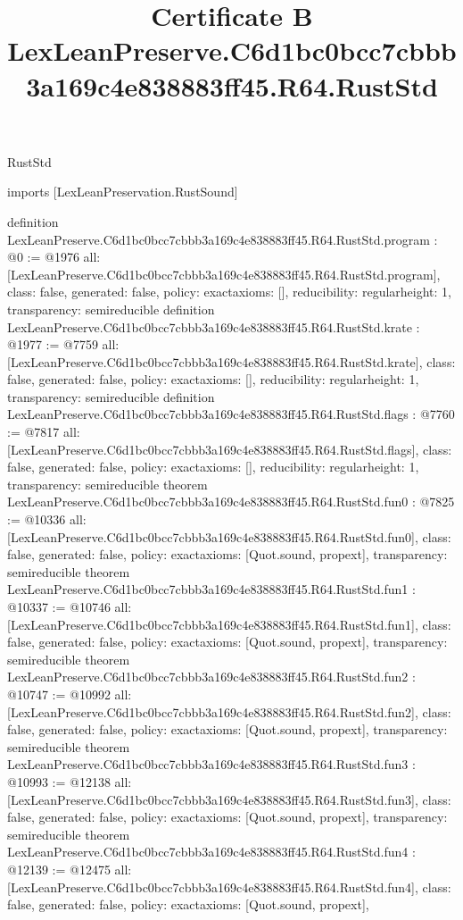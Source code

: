 \begin{lexlean}{RustStd}
\title{Certificate B LexLeanPreserve.C6d1bc0bcc7cbbb3a169c4e838883ff45.R64.RustStd}
\begin{coremodule}
imports [LexLeanPreservation.RustSound]

definition LexLeanPreserve.C6d1bc0bcc7cbbb3a169c4e838883ff45.R64.RustStd.program : @0 := @1976 {
  all: [LexLeanPreserve.C6d1bc0bcc7cbbb3a169c4e838883ff45.R64.RustStd.program],
  class: false,
  generated: false,
  policy: exact{axioms: []},
  reducibility: regular{height: 1},
  transparency: semireducible
}
definition LexLeanPreserve.C6d1bc0bcc7cbbb3a169c4e838883ff45.R64.RustStd.krate : @1977 := @7759 {
  all: [LexLeanPreserve.C6d1bc0bcc7cbbb3a169c4e838883ff45.R64.RustStd.krate],
  class: false,
  generated: false,
  policy: exact{axioms: []},
  reducibility: regular{height: 1},
  transparency: semireducible
}
definition LexLeanPreserve.C6d1bc0bcc7cbbb3a169c4e838883ff45.R64.RustStd.flags : @7760 := @7817 {
  all: [LexLeanPreserve.C6d1bc0bcc7cbbb3a169c4e838883ff45.R64.RustStd.flags],
  class: false,
  generated: false,
  policy: exact{axioms: []},
  reducibility: regular{height: 1},
  transparency: semireducible
}
theorem LexLeanPreserve.C6d1bc0bcc7cbbb3a169c4e838883ff45.R64.RustStd.fun0 : @7825 := @10336 {
  all: [LexLeanPreserve.C6d1bc0bcc7cbbb3a169c4e838883ff45.R64.RustStd.fun0],
  class: false,
  generated: false,
  policy: exact{axioms: [Quot.sound, propext]},
  transparency: semireducible
}
theorem LexLeanPreserve.C6d1bc0bcc7cbbb3a169c4e838883ff45.R64.RustStd.fun1 : @10337 := @10746 {
  all: [LexLeanPreserve.C6d1bc0bcc7cbbb3a169c4e838883ff45.R64.RustStd.fun1],
  class: false,
  generated: false,
  policy: exact{axioms: [Quot.sound, propext]},
  transparency: semireducible
}
theorem LexLeanPreserve.C6d1bc0bcc7cbbb3a169c4e838883ff45.R64.RustStd.fun2 : @10747 := @10992 {
  all: [LexLeanPreserve.C6d1bc0bcc7cbbb3a169c4e838883ff45.R64.RustStd.fun2],
  class: false,
  generated: false,
  policy: exact{axioms: [Quot.sound, propext]},
  transparency: semireducible
}
theorem LexLeanPreserve.C6d1bc0bcc7cbbb3a169c4e838883ff45.R64.RustStd.fun3 : @10993 := @12138 {
  all: [LexLeanPreserve.C6d1bc0bcc7cbbb3a169c4e838883ff45.R64.RustStd.fun3],
  class: false,
  generated: false,
  policy: exact{axioms: [Quot.sound, propext]},
  transparency: semireducible
}
theorem LexLeanPreserve.C6d1bc0bcc7cbbb3a169c4e838883ff45.R64.RustStd.fun4 : @12139 := @12475 {
  all: [LexLeanPreserve.C6d1bc0bcc7cbbb3a169c4e838883ff45.R64.RustStd.fun4],
  class: false,
  generated: false,
  policy: exact{axioms: [Quot.sound, propext]},
}
\end{coremodule}
\end{lexlean}
